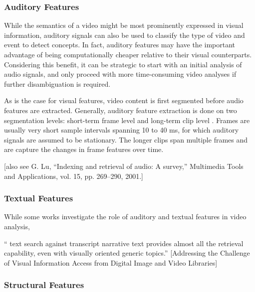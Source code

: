 \subsubsection{Auditory Features}

While the semantics of a video might be most prominently expressed in visual information, auditory signals can also be used to classify the type of video and event to detect concepts. In fact, auditory features may have the important advantage of being computationally cheaper relative to their visual counterparts. Considering this benefit, it can be strategic to start with an initial analysis of audio signals, and only proceed with more time-consuming video analyses if further disambiguation is required.

As is the case for visual features, video content is first segmented before audio features are extracted. Generally, auditory feature extraction is done on two segmentation levels: short-term frame level and long-term clip level \cite{Wang:2000vf}. Frames are usually very short sample intervals spanning 10 to 40 ms, for which auditory signals are assumed to be stationary. The longer clips span multiple frames and are capture the changes in frame features over time.



[also see G. Lu, “Indexing and retrieval of audio: A survey,” Multimedia Tools and Applications, vol. 15, pp. 269–290, 2001.]

\subsubsection{Textual Features}

While some works investigate the role of auditory\cite{Wang:2000vf} and textual features\cite{Kuwano:2000wy} in video analysis, 

`` text search against transcript narrative text provides almost all the retrieval capability, even with visually oriented generic topics.''
[Addressing the Challenge of Visual Information Access from Digital Image and Video Libraries]\cite{Christel:2005td}







\subsubsection{Structural Features}




